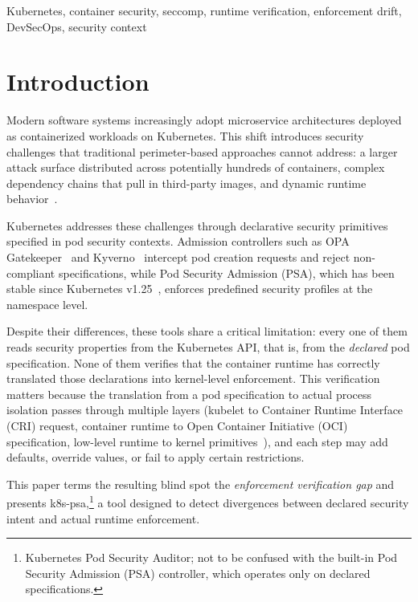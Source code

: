 \documentclass[conference]{IEEEtran}
\begin{document}
\begin{IEEEkeywords}
Kubernetes, container security, seccomp, runtime verification, enforcement drift, DevSecOps, security context
\end{IEEEkeywords}

\section{Introduction}

Modern software systems increasingly adopt microservice architectures deployed as containerized workloads on Kubernetes. This shift introduces security challenges that traditional perimeter-based approaches cannot address: a larger attack surface distributed across potentially hundreds of containers, complex dependency chains that pull in third-party images, and dynamic runtime behavior~\cite{wong2023, devipriya2023}.

Kubernetes addresses these challenges through declarative security primitives specified in pod security contexts. Admission controllers such as OPA Gatekeeper~\cite{gatekeeper2024} and Kyverno~\cite{kyverno2024} intercept pod creation requests and reject non-compliant specifications, while Pod Security Admission (PSA), which has been stable since Kubernetes v1.25~\cite{k8spsa2022}, enforces predefined security profiles at the namespace level.

Despite their differences, these tools share a critical limitation: every one of them reads security properties from the Kubernetes API, that is, from the \emph{declared} pod specification. None of them verifies that the container runtime has correctly translated those declarations into kernel-level enforcement. This verification matters because the translation from a pod specification to actual process isolation passes through multiple layers (kubelet to Container Runtime Interface (CRI) request, container runtime to Open Container Initiative (OCI) specification, low-level runtime to kernel primitives~\cite{k8sseccomp2024}), and each step may add defaults, override values, or fail to apply certain restrictions.

This paper terms the resulting blind spot the \emph{enforcement verification gap} and presents k8s-psa,\footnote{Kubernetes Pod Security Auditor; not to be confused with the built-in Pod Security Admission (PSA) controller, which operates only on declared specifications.} a tool designed to detect divergences between declared security intent and actual runtime enforcement.
\end{document}
